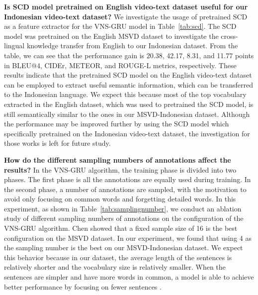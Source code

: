 \documentclass{article}
\begin{document}
\textbf{Is SCD model pretrained on English video-text dataset useful for our Indonesian video-text dataset?} We investigate the usage of pretrained SCD as a feature extractor for the VNS-GRU model in Table~\ref{tab:scd}. The SCD model was pretrained on the English MSVD dataset to investigate the cross-lingual knowledge transfer from English to our Indonesian dataset. From the table, we can see that the performance gain is 20.38, 42.17, 8.31, and 11.77 points in BLEU@4, CIDEr, METEOR, and ROUGE-L metrics, respectively. These results indicate that the pretrained SCD model on the English video-text dataset can be employed to extract useful semantic information, which can be transferred to the Indonesian language. We expect this because most of the top  vocabulary extracted in the English dataset, which was used to pretrained the SCD model, is still semantically similar to the ones in our MSVD-Indonesian dataset. Although the performance may be improved further by using the SCD model which specifically pretrained on the Indonesian video-text dataset, the investigation for those works is left for future study.



\textbf{How do the different sampling numbers of annotations affect the results?} In the VNS-GRU algorithm, the training phase is divided into two phases. The first phase is all the annotations are equally used during training. In the second phase, a number of annotations are sampled, with the motivation to avoid only focusing on common words and forgetting detailed words. In this experiment, as shown in Table~\ref{tab:samplingnumber}, we conduct an ablation study of different sampling numbers of annotations on the configuration of the VNS-GRU algorithm. Chen \etal showed that a fixed sample size of 16 is the best configuration on the MSVD dataset. In our experiment, we found that using 4 as the sampling number is the best on our MSVD-Indonesian dataset. We expect this behavior because in our dataset, the average length of the sentences is relatively shorter and the vocabulary size is relatively smaller. When the sentences are simpler and have more words in common, a model is able to achieve better performance by focusing on fewer sentences \cite{DBLP:conf/ecai/Chen0020a}.
\end{document}
